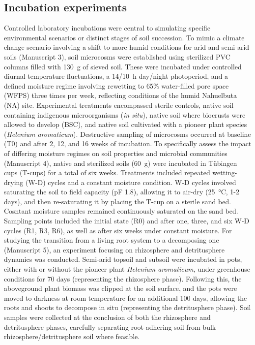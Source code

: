 \subsection{Incubation experiments}

Controlled laboratory incubations were central to simulating specific environmental scenarios or distinct stages of soil succession. To mimic a climate change scenario involving a shift to more humid conditions for arid and semi-arid soils (Manuscript 3), soil microcosms were established using sterilized PVC columns filled with \SI{130}{\gram} of sieved soil. These were incubated under controlled diurnal temperature fluctuations, a 14/\SI{10}{\hour} day/night photoperiod, and a defined moisture regime involving rewetting to 65\% water-filled pore space (WFPS) three times per week, reflecting conditions of the humid Nahuelbuta (NA) site. Experimental treatments encompassed sterile controls, native soil containing indigenous microorganisms (\textit{in situ}), native soil where biocrusts were allowed to develop (BSC), and native soil cultivated with a pioneer plant species (\textit{Helenium aromaticum}). Destructive sampling of microcosms occurred at baseline (T0) and after 2, 12, and 16 weeks of incubation. To specifically assess the impact of differing moisture regimes on soil properties and microbial communities (Manuscript 4), native and sterilized soils (\SI{60}{\gram}) were incubated in Tübingen cups (T-cups) for a total of six weeks. Treatments included repeated wetting-drying (W-D) cycles and a constant moisture condition. W-D cycles involved saturating the soil to field capacity (pF 1.8), allowing it to air-dry (\SI{25}{\degreeCelsius}, 1-2 days), and then re-saturating it by placing the T-cup on a sterile sand bed. Cosntant moisture samples remained continuously saturated on the sand bed. Sampling points included the initial state (R0) and after one, three, and six W-D cycles (R1, R3, R6), as well as after six weeks under constant moisture. For studying the transition from a living root system to a decomposing one (Manuscript 5), an experiment focusing on rhizosphere and detritusphere dynamics was conducted. Semi-arid topsoil and subsoil were incubated in pots, either with or without the pioneer plant \textit{Helenium aromaticum}, under greenhouse conditions for 70 days (representing the rhizosphere phase). Following this, the aboveground plant biomass was clipped at the soil surface, and the pots were moved to darkness at room temperature for an additional 100 days, allowing the roots and shoots to decompose in situ (representing the detritusphere phase). Soil samples were collected at the conclusion of both the rhizosphere and detritusphere phases, carefully separating root-adhering soil from bulk rhizosphere/detritusphere soil where feasible.

